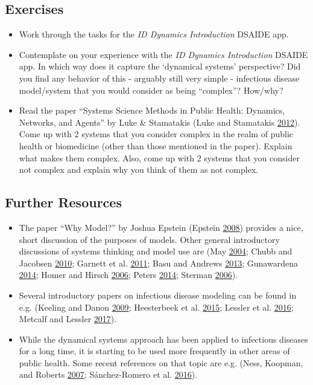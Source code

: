 \documentclass[]{article}
\providecommand{\tightlist}{%
  \setlength{\itemsep}{0pt}\setlength{\parskip}{0pt}}
\theoremstyle{definition}
\theoremstyle{definition}
\theoremstyle{definition}
\theoremstyle{remark}
\begin{document}
\subsection{Exercises}\label{exercises}

\begin{itemize}
\tightlist
\item
  Work through the tasks for the \emph{ID Dynamics Introduction} DSAIDE
  app.
\item
  Contemplate on your experience with the \emph{ID Dynamics
  Introduction} DSAIDE app. In which way does it capture the `dynamical
  systems' perspective? Did you find any behavior of this - arguably
  still very simple - infectious disease model/system that you would
  consider as being ``complex''? How/why?
\item
  Read the paper ``Systems Science Methods in Public Health: Dynamics,
  Networks, and Agents'' by Luke \& Stamatakis (Luke and Stamatakis
  \protect\hyperlink{ref-luke12}{2012}). Come up with 2 systems that you
  consider complex in the realm of public health or biomedicine (other
  than those mentioned in the paper). Explain what makes them complex.
  Also, come up with 2 systems that you consider not complex and explain
  why you think of them as not complex.
\end{itemize}

\subsection{Further Resources}\label{further-resources}

\begin{itemize}
\tightlist
\item
  The paper ``Why Model?'' by Joshua Epstein (Epstein
  \protect\hyperlink{ref-epstein08}{2008}) provides a nice, short
  discussion of the purposes of models. Other general introductory
  discussions of systems thinking and model use are (May
  \protect\hyperlink{ref-may04}{2004}; Chubb and Jacobsen
  \protect\hyperlink{ref-chubb10}{2010}; Garnett et al.
  \protect\hyperlink{ref-garnett11}{2011}; Basu and Andrews
  \protect\hyperlink{ref-basu13}{2013}; Gunawardena
  \protect\hyperlink{ref-gunawardena14}{2014}; Homer and Hirsch
  \protect\hyperlink{ref-homer06}{2006}; Peters
  \protect\hyperlink{ref-peters14}{2014}; Sterman
  \protect\hyperlink{ref-sterman06}{2006}).
\item
  Several introductory papers on infectious disease modeling can be
  found in e.g. (Keeling and Danon
  \protect\hyperlink{ref-keeling09}{2009}; Heesterbeek et al.
  \protect\hyperlink{ref-heesterbeek15}{2015}; Lessler et al.
  \protect\hyperlink{ref-lessler16}{2016}; Metcalf and Lessler
  \protect\hyperlink{ref-metcalf17}{2017}).
\item
  While the dynamical systems approach has been applied to infectious
  diseases for a long time, it is starting to be used more frequently in
  other areas of public health. Some recent references on that topic are
  e.g. (Ness, Koopman, and Roberts \protect\hyperlink{ref-ness07}{2007};
  Sánchez-Romero et al. \protect\hyperlink{ref-sanchez-romero16}{2016}).
\end{itemize}
\end{document}
